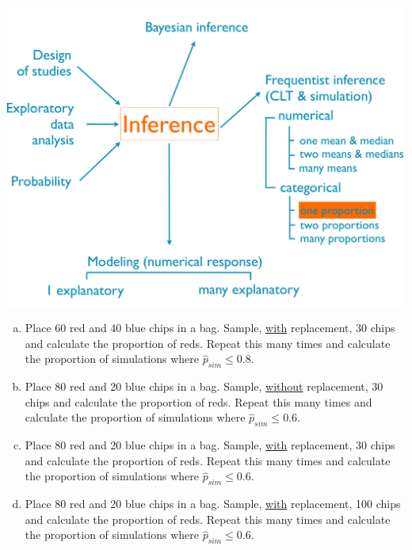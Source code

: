 \documentclass[11pt,containsverbatim,handout,xcolor=xelatex,dvipsnames,table]{beamer}
\newcommand{\solnMult}[1]{#1}
\begin{document}
\begin{frame}

{
{\scriptsize
{}}}
{
 \includegraphics[width=\textwidth]{figures/map/one_prop}
}

\vfill

{\footnotesize
\begin{enumerate}[(a)]
\item Place 60 red and 40 blue chips in a bag. Sample, \underline{with} replacement, 30 chips and calculate the proportion of reds. Repeat this many times and calculate the proportion of simulations where $\hat{p}_{sim} \le 0.8$. 
\item Place 80 red and 20 blue chips in a bag. Sample, \underline{without} replacement, 30 chips and calculate the proportion of reds. Repeat this many times and calculate the proportion of simulations where $\hat{p}_{sim} \le 0.6$.
\item \solnMult{Place 80 red and 20 blue chips in a bag. Sample, \underline{with} replacement, 30 chips and calculate the proportion of reds. Repeat this many times and calculate the proportion of simulations where $\hat{p}_{sim} \le 0.6$.}
\item Place 80 red and 20 blue chips in a bag. Sample, \underline{with} replacement, 100 chips and calculate the proportion of reds. Repeat this many times and calculate the proportion of simulations where $\hat{p}_{sim} \le 0.6$. 
\end{enumerate}
}

\end{frame}

\end{document}
